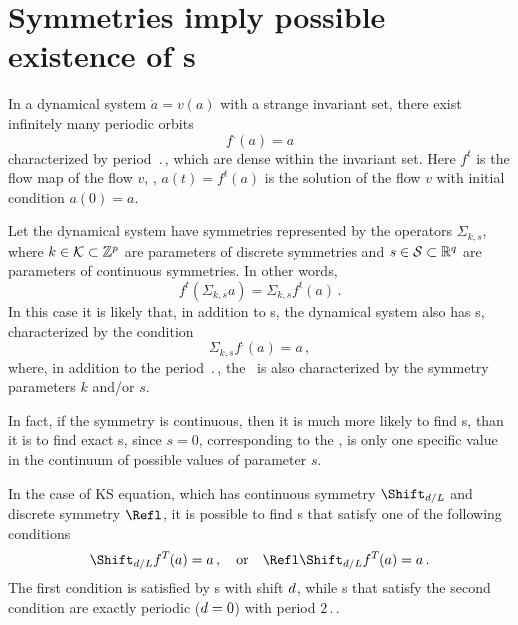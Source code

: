 

\section{Symmetries imply possible existence of \rpo s}
\label{sec:SymRPO}

In a dynamical system $\dot{a} = v(a)$ with a strange invariant set, there exist
infinitely many periodic orbits
\[ f^\period{}(a) = a \]
characterized by period $\period{}$, which are dense within the invariant set.
Here $f^t$ is the flow map of the flow $v$, \ie, $a(t) = f^t(a)$ is the
solution of the flow $v$ with initial condition $a(0) = a$.

Let the dynamical system have symmetries represented by the operators
$\Sigma_{k,s}$, where $k \in {\cal K} \subset \mathbb{Z}^p$ are
parameters of discrete symmetries and $s \in {\cal S} \subset \mathbb{R}^q$
are parameters of continuous symmetries.  In other words,
\[ f^t(\Sigma_{k,s} a) = \Sigma_{k,s} f^t(a)\,. \]
In this case it is likely that, in addition to \po s, the dynamical system also
has \rpo s, characterized by the condition
\[ \Sigma_{k,s}f^\period{}(a) = a\,, \]
where, in addition to the period $\period{}$, the \rpo\ is also characterized by
the symmetry parameters $k$ and/or $s$.

In fact, if the symmetry is continuous, then it is much more likely
to find \rpo s, than it is to find exact \po s, since $s = 0$,
corresponding to the \po , is only one specific value in the
continuum of possible values of parameter $s$.

In the case of KS equation, which has continuous symmetry
$\Shift_{\shift/L}$ and discrete symmetry $\Refl$, it is possible to
find \rpo s that satisfy one of the following conditions
\[
  \Shift_{\shift/L}f^\period{}(a) = a\,,
\quad\mbox{or}\quad
  \Refl\Shift_{\shift/L}f^\period{}(a) = a\,.
\]
The first condition is satisfied by \rpo s with shift $d$,
while \rpo s that satisfy the second condition are exactly periodic
($d = 0$) with period $2\period{}$.


    
